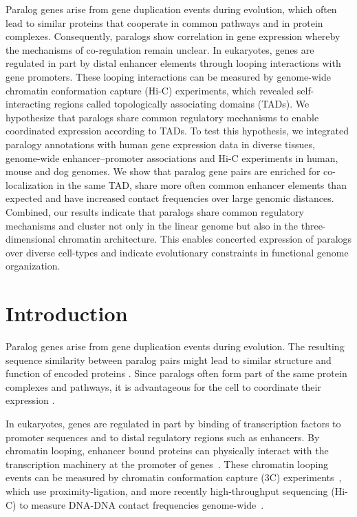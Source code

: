 \documentclass[a4paper,twoside=true,openright,parskip=full,chapterprefix=true,11pt,headings=normal,bibliography=totoc,listof=totoc,titlepage=on,captions=tableabove,draft=false]{scrreprt}
\theoremstyle{definition}
\theoremstyle{definition}
\theoremstyle{definition}
\theoremstyle{remark}
\begin{document}
Paralog genes arise from gene duplication events during evolution, which
often lead to similar proteins that cooperate in common pathways and in
protein complexes. Consequently, paralogs show correlation in gene
expression whereby the mechanisms of co-regulation remain unclear. In
eukaryotes, genes are regulated in part by distal enhancer elements
through looping interactions with gene promoters. These looping
interactions can be measured by genome-wide chromatin conformation
capture (Hi-C) experiments, which revealed self-interacting regions
called topologically associating domains (TADs). We hypothesize that
paralogs share common regulatory mechanisms to enable coordinated
expression according to TADs. To test this hypothesis, we integrated
paralogy annotations with human gene expression data in diverse tissues,
genome-wide enhancer--promoter associations and Hi-C experiments in
human, mouse and dog genomes. We show that paralog gene pairs are
enriched for co-localization in the same TAD, share more often common
enhancer elements than expected and have increased contact frequencies
over large genomic distances. Combined, our results indicate that
paralogs share common regulatory mechanisms and cluster not only in the
linear genome but also in the three-dimensional chromatin architecture.
This enables concerted expression of paralogs over diverse cell-types
and indicate evolutionary constraints in functional genome organization.

\section{Introduction}\label{introduction}

Paralog genes arise from gene duplication events during evolution. The
resulting sequence similarity between paralog pairs might lead to
similar structure and function of encoded proteins \citep{Koonin2005}.
Since paralogs often form part of the same protein complexes and
pathways, it is advantageous for the cell to coordinate their expression
\citep{Makova2003}.

In eukaryotes, genes are regulated in part by binding of transcription
factors to promoter sequences and to distal regulatory regions such as
enhancers. By chromatin looping, enhancer bound proteins can physically
interact with the transcription machinery at the promoter of
genes~\citep{Ptashne1986, Deng2012, Carter2002, Tolhuis2002, Spitz2012}.
These chromatin looping events can be measured by chromatin conformation
capture (3C) experiments~\citep{Dekker2002}, which use
proximity-ligation, and more recently high-throughput sequencing (Hi-C)
to measure DNA-DNA contact frequencies
genome-wide~\citep{Lieberman-Aiden2009}.
\end{document}
